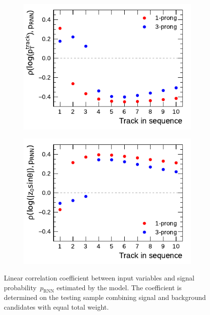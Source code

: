 \begin{figure}[htb]
  \centering
  \begin{subfigure}[t]{0.48\textwidth}
    \centering
    \includegraphics{./figures/rnn/track/pt_corr.pdf}
    \label{fig:track_rnn_corr_pt}
  \end{subfigure}\hfill
  \begin{subfigure}[t]{0.48\textwidth}
    \centering
    \includegraphics{./figures/rnn/track/z0_corr.pdf}
    \label{fig:track_rnn_corr_z0}
  \end{subfigure}
  \caption{Linear correlation coefficient between input variables and signal
    probability~$p_\text{RNN}$ estimated by the model. The coefficient is
    determined on the testing sample combining signal and background candidates
    with equal total weight.}
  \label{fig:track_rnn_correlations}
\end{figure}

